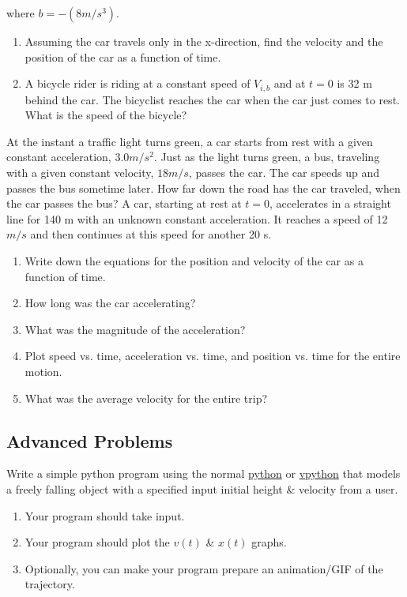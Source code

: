 \documentclass[12pt,addpoints]{exam}
\begin{document}
\begin{questions}
		where $b = -(8 m/s^3)$.
		\begin{enumerate}[label*=(\Alph*)]
			\item Assuming the car travels only in the x-direction, find the velocity and the position of the car as a function of time.
			\item A bicycle rider is riding at a constant speed of  $V_{i,b}$
			and at $t = 0$ is 32 m behind the car. The bicyclist reaches the car when the car just comes to rest. What is the speed of the bicycle?
		\end{enumerate}
		\question[15] At the instant a traffic light turns green, a car starts from rest with a given constant acceleration, $3.0m/s^{2}$. Just as the light turns green, a bus, traveling with a given constant velocity,  $18m/s$, passes the car. The car speeds up and passes the bus sometime later. How far down the road has the car traveled, when the car passes the bus?
		\question[15] A car, starting at rest at  $t=0$, accelerates in a straight line for 140 m with an unknown constant acceleration. It reaches a speed of 12 $m/s$ and then continues at this speed for another 20 s.
		\begin{enumerate}[label*=(\Alph*)]
			\item Write down the equations for the position and velocity of the car as a function of time.
			\item How long was the car accelerating?
			\item What was the magnitude of the acceleration?
			\item Plot speed vs. time, acceleration vs. time, and position vs. time for the entire motion.
			\item What was the average velocity for the entire trip?
		\end{enumerate}
		\subsection*{Advanced Problems}
		\question[10] Write a simple python program using the normal \href{https://python.org}{python} or \href{https://vpython.org/}{vpython} that models a freely falling object with a specified input initial height \& velocity from a user.
		\begin{enumerate}[label*=(\alph*)]
			\item Your program should take input.
			\item Your program should plot the $v(t)$ \& $x(t)$ graphs.
			\item Optionally, you can make your program prepare an animation/GIF of the trajectory. 
		\end{enumerate}
	\end{questions}	
		
\end{document}
